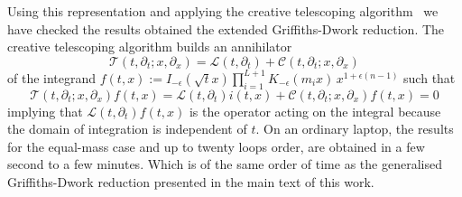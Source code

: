 \documentclass[a4paper,12pt]{article}
\numberwithin{equation}{section}
\numberwithin{figure}{section}
\begin{document}
Using this representation and applying the creative telescoping
algorithm~\cite{Chyzak,Chyzak2,bostan2013creative,Koutchan} we have checked the results obtained the
extended Griffiths-Dwork reduction.
The creative telescoping algorithm builds an annihilator
\begin{equation}
  \mathscr{T}(t,\partial_t; x,\partial_x)= \mathscr{L}(t,\partial_t)+ \mathscr{C}(  t,\partial_t; x,\partial_x)
\end{equation}
of the integrand
$f(t,x):= I_{-\epsilon}(\sqrt{t} x)
  \prod_{i=1}^{L+1}K_{-\epsilon}(m_ix)\,  x^{1+\epsilon(n-1)}$
such that
\begin{equation}
      \mathscr{T}(t,\partial_t; x,\partial_x) f(t,x)=\mathscr{L}(t,\partial_t)i(t,x)+ \mathscr{C}(  t,\partial_t; x,\partial_x) f(t,x)=0
    \end{equation}
    implying that $\mathscr{L}(t,\partial_t)f(t,x)$ is the operator acting
    on the integral because the domain of integration is independent
    of $t$.
On an ordinary laptop, the results for the equal-mass case and up to twenty loops order, are obtained in
a few second to a few minutes. Which is of the same order of time as
the generalised Griffiths-Dwork reduction presented in the main text
of this work.
    
\end{document}
